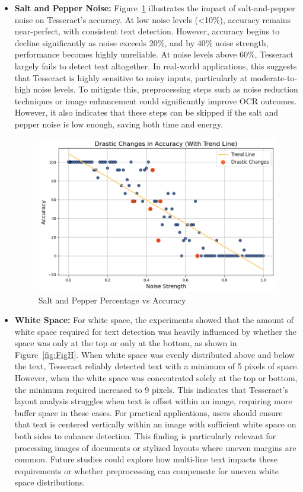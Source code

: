 \documentclass[10pt,twocolumn]{article}
\begin{document}
\begin{itemize}
\item \textbf{Salt and Pepper Noise:} Figure~\ref{fig:FigG} illustrates the impact of salt-and-pepper noise on Tesseract’s accuracy. At low noise levels (<10\%), accuracy remains near-perfect, with consistent text detection. However, accuracy begins to decline significantly as noise exceeds 20\%, and by 40\% noise strength, performance becomes highly unreliable. At noise levels above 60\%, Tesseract largely fails to detect text altogether. In real-world applications, this suggests that Tesseract is highly sensitive to noisy inputs, particularly at moderate-to-high noise levels. To mitigate this, preprocessing steps such as noise reduction techniques or image enhancement could significantly improve OCR outcomes. However, it also indicates that these steps can be skipped if the salt and pepper noise is low enough, saving both time and energy.
\begin{figure}[h!]
    \centering
    \includegraphics[width=\linewidth]{Figures/Figure_G.png}
    \caption{Salt and Pepper Percentage vs Accuracy}
    \label{fig:FigG}
\end{figure}
\item \textbf{White Space:} For white space, the experiments showed that the amount of white space required for text detection was heavily influenced by whether the space was only at the top or only at the bottom, as shown in Figure~\ref{fig:FigH}. When white space was evenly distributed above and below the text, Tesseract reliably detected text with a minimum of 5 pixels of space. However, when the white space was concentrated solely at the top or bottom, the minimum required increased to 9 pixels. This indicates that Tesseract's layout analysis struggles when text is offset within an image, requiring more buffer space in these cases. For practical applications, users should ensure that text is centered vertically within an image with sufficient white space on both sides to enhance detection. This finding is particularly relevant for processing images of documents or stylized layouts where uneven margins are common. Future studies could explore how multi-line text impacts these requirements or whether preprocessing can compensate for uneven white space distributions.

\end{itemize}
\end{document}
